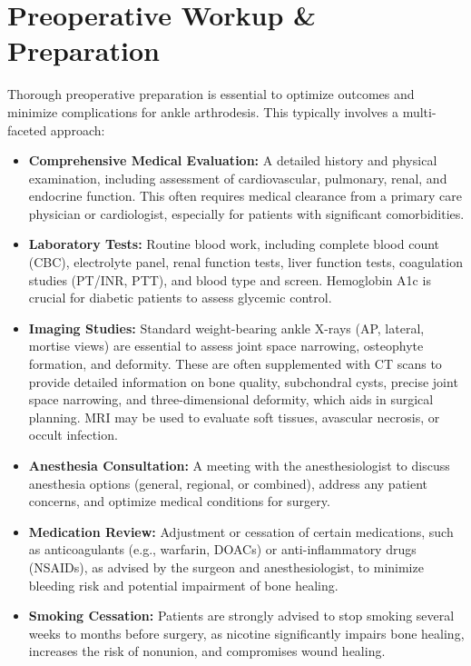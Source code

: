 \section*{Preoperative Workup \& Preparation}
Thorough preoperative preparation is essential to optimize outcomes and minimize complications for ankle arthrodesis. This typically involves a multi-faceted approach:

\begin{itemize}
  \item \textbf{Comprehensive Medical Evaluation:} A detailed history and physical examination, including assessment of cardiovascular, pulmonary, renal, and endocrine function. This often requires medical clearance from a primary care physician or cardiologist, especially for patients with significant comorbidities.
  
  \item \textbf{Laboratory Tests:} Routine blood work, including complete blood count (CBC), electrolyte panel, renal function tests, liver function tests, coagulation studies (PT/INR, PTT), and blood type and screen. Hemoglobin A1c is crucial for diabetic patients to assess glycemic control.
  
  \item \textbf{Imaging Studies:} Standard weight-bearing ankle X-rays (AP, lateral, mortise views) are essential to assess joint space narrowing, osteophyte formation, and deformity. These are often supplemented with CT scans to provide detailed information on bone quality, subchondral cysts, precise joint space narrowing, and three-dimensional deformity, which aids in surgical planning. MRI may be used to evaluate soft tissues, avascular necrosis, or occult infection.
  
  \item \textbf{Anesthesia Consultation:} A meeting with the anesthesiologist to discuss anesthesia options (general, regional, or combined), address any patient concerns, and optimize medical conditions for surgery.
  
  \item \textbf{Medication Review:} Adjustment or cessation of certain medications, such as anticoagulants (e.g., warfarin, DOACs) or anti-inflammatory drugs (NSAIDs), as advised by the surgeon and anesthesiologist, to minimize bleeding risk and potential impairment of bone healing.
  
  \item \textbf{Smoking Cessation:} Patients are strongly advised to stop smoking several weeks to months before surgery, as nicotine significantly impairs bone healing, increases the risk of nonunion, and compromises wound healing.
  

\end{itemize}
